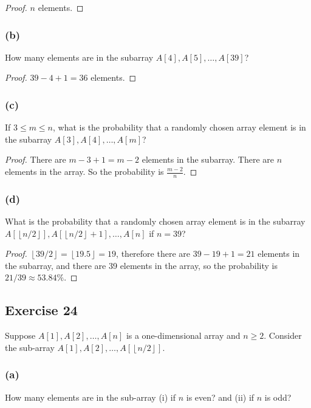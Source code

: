 \documentclass[14pt]{extarticle}
\newcommand{\floor}[1]{{\left\lfloor#1\right\rfloor}}
\begin{document}
\begin{proof}
$n$ elements.
\end{proof}

\subsubsection{(b)}
How many elements are in the subarray \(A[4], A[5], \ldots, A[39]\)?

\begin{proof}
\(39 - 4 + 1 = 36\) elements.
\end{proof}

\subsubsection{(c)}
If \(3 \leq m \leq n\), what is the probability that a randomly chosen array element is in the subarray 
\(A[3], A[4], \ldots, A[m]\)?

\begin{proof}
There are \(m - 3 + 1 = m-2\) elements in the subarray. There are $n$ elements in the array. So the probability is 
\(\frac{m-2}{n}\).
\end{proof}

\subsubsection{(d)}
What is the probability that a randomly chosen array element is in the subarray \\
\(A[\floor{n/2}], A[\floor{n/2}+1], \ldots, A[n]\) if \(n = 39\)?

\begin{proof}
\(\floor{39/2} = \floor{19.5} = 19\), therefore there are \(39 - 19 + 1 = 21\) elements in the subarray, and there 
are 39 elements in the array, so the probability is \(21/39 \approx 53.84\%\).
\end{proof}

\subsection{Exercise 24}
Suppose \(A[1], A[2], \ldots, A[n]\) is a one-dimensional array and \(n \geq 2\). Consider the sub-array 
\(A[1], A[2], \ldots, A[\floor{n/2}]\).

\subsubsection{(a)}
How many elements are in the sub-array (i) if $n$ is even? and (ii) if $n$ is odd?
\end{document}
